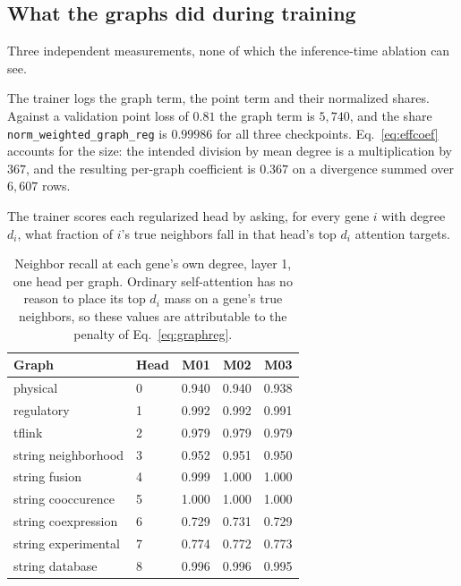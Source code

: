 \subsection{What the graphs did during training}
\label{sec:graphablation}

Three independent measurements, none of which the inference-time ablation can
see.

The trainer logs the graph term, the point term and their normalized shares.
Against a validation point loss of $0.81$ the graph term is $5{,}740$, and the
share \texttt{norm\_weighted\_graph\_reg} is $0.99986$ for all three checkpoints.
Eq.~\ref{eq:effcoef} accounts for the size: the intended division by mean degree
is a multiplication by $367$, and the resulting per-graph coefficient is $0.367$
on a divergence summed over $6{,}607$ rows.

The trainer scores each regularized head by asking, for every gene $i$ with
degree $d_i$, what fraction of $i$'s true neighbors fall in that head's top $d_i$
attention targets.

\begin{table}[htbp]
\centering
\begin{tabular}{llrrr}
\hline
Graph & Head & M01 & M02 & M03 \\
\hline
physical & 0 & 0.940 & 0.940 & 0.938 \\
regulatory & 1 & 0.992 & 0.992 & 0.991 \\
tflink & 2 & 0.979 & 0.979 & 0.979 \\
string neighborhood & 3 & 0.952 & 0.951 & 0.950 \\
string fusion & 4 & 0.999 & 1.000 & 1.000 \\
string cooccurence & 5 & 1.000 & 1.000 & 1.000 \\
string coexpression & 6 & 0.729 & 0.731 & 0.729 \\
string experimental & 7 & 0.774 & 0.772 & 0.773 \\
string database & 8 & 0.996 & 0.996 & 0.995 \\
\hline
\end{tabular}
\caption{Neighbor recall at each gene's own degree, layer 1, one head per graph.
Ordinary self-attention has no reason to place its top $d_i$ mass on a gene's
true neighbors, so these values are attributable to the penalty of
Eq.~\ref{eq:graphreg}.}
\label{tab:edgerecovery}
\end{table}

